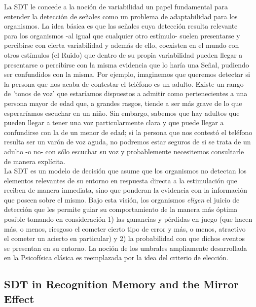 \documentclass[jou,apacite]{apa6}
\begin{document}
La SDT le concede a la noción de variabilidad un papel fundamental para entender la detección de señales como un problema de adaptabilidad para los organismos. La idea básica es que las señales cuya detección resulta relevante para los organismos -al igual que cualquier otro estímulo- suelen presentarse y percibirse con cierta variabilidad y además de ello, coexisten en el mundo con otros estímulos (el Ruido) que dentro de su propia variabilidad pueden llegar a presentarse o percibirse con la misma evidencia que lo haría una Señal, pudiendo ser confundidos con la misma. Por ejemplo, imaginemos que queremos detectar si la persona que nos acaba de contestar el teléfono es un adulto. Existe un rango de 'tonos de voz' que estaríamos dispuestos a admitir como pertenecientes a una persona mayor de edad que, a grandes rasgos, tiende a ser más grave de lo que esperaríamos escuchar en un niño. Sin embargo, sabemos que hay adultos que pueden llegar a tener una voz particularmente clara y que puede llegar a confundirse con la de un menor de edad; si la persona que nos contestó el teléfono resulta ser un varón de voz aguda, no podremos estar seguros de si se trata de un adulto -o no- con sólo escuchar su voz y probablemente necesitemos consultarle de manera explícita.\\

La SDT es un modelo de decisión que asume que los organismos no detectan los elementos relevantes de su entorno en respuesta directa a la estimulación que reciben de manera inmediata, sino que ponderan la evidencia con la información que poseen sobre el mismo. Bajo esta visión, los organismos \textit{eligen} el juicio de detección que les permite guiar su comportamiento de la manera más óptima posible tomando en consideración 1) las ganancias y pérdidas en juego (que hacen más, o menos, riesgoso el cometer cierto tipo de error y más, o menos, atractivo el cometer un acierto en particular) y 2) la probabilidad con que dichos eventos se presentan en su entorno.  La noción de los umbrales ampliamente desarrollada en la Psicofísica clásica es reemplazada por la idea del criterio de elección.\\ 

\subsection{SDT in Recognition Memory and the Mirror Effect}
\end{document}
